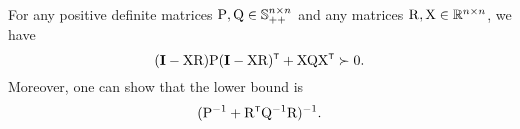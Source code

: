 \begin{lemma}\label{lem:PD}
    For any positive definite matrices ${ \mathrm{P} }, { \mathrm{Q} }  \in {\mathbb{S}}_{++}^{n\times n}$ and any matrices ${ \mathrm{R} },{ \mathrm{X} }\in{\mathbb{R}}^{n\times n}$, we have 
    \begin{equation}
            (\mathbf{I} - \mxX \mxR)
        \mxP 
            (\mathbf{I} - \mxX \mxR)
        ^\tr
        +
        \mxX\mxQ\mxX^\tr
        \succ 0.
    \end{equation}
    Moreover, one can show that the lower bound is 
\begin{equation}
    (\mxP^{-1} + \mxR^\tr \mxQ^{-1}\mxR)^{-1}.
\end{equation}
\end{lemma}

